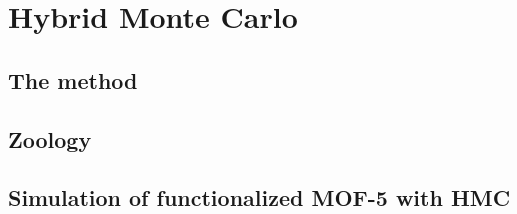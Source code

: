 \documentclass[thesis]{subfiles}
\begin{document}
\chapter{Hybrid Monte Carlo}
\startcontents[chapters]
\printpartialtoc

\section{The method}

\section{Zoology}

\section{Simulation of functionalized MOF-5 with HMC}
\end{document}
